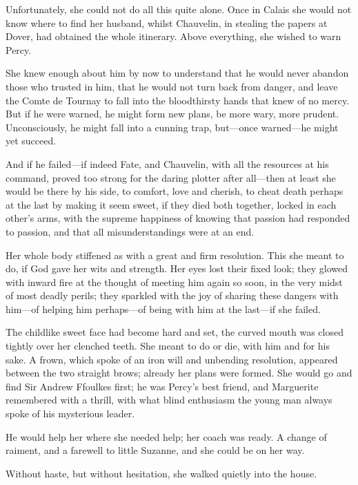 Unfortunately, she could not do all this quite alone. Once in Calais she would not know where to find her husband, whilst Chauvelin, in stealing the papers at Dover, had obtained the whole itinerary. Above everything, she wished to warn Percy.

She knew enough about him by now to understand that he would never abandon those who trusted in him, that he would not turn back from danger, and leave the Comte de Tournay to fall into the bloodthirsty hands that knew of no mercy. But if he were warned, he might form new plans, be more wary, more prudent. Unconsciously, he might fall into a cunning trap, but\allowbreak---\allowbreak once warned\allowbreak---\allowbreak he might yet succeed.

And if he failed\allowbreak---\allowbreak if indeed Fate, and Chauvelin, with all the resources at his command, proved too strong for the daring plotter after all\allowbreak---\allowbreak then at least she would be there by his side, to comfort, love and cherish, to cheat death perhaps at the last by making it seem sweet, if they died both together, locked in each other's arms, with the supreme happiness of knowing that passion had responded to passion, and that all misunderstandings were at an end.

Her whole body stiffened as with a great and firm resolution. This she meant to do, if God gave her wits and strength. Her eyes lost their fixed look; they glowed with inward fire at the thought of meeting him again so soon, in the very midst of most deadly perils; they sparkled with the joy of sharing these dangers with him\allowbreak---\allowbreak of helping him perhaps\allowbreak---\allowbreak of being with him at the last\allowbreak---\allowbreak if she failed.

The childlike sweet face had become hard and set, the curved mouth was closed tightly over her clenched teeth. She meant to do or die, with him and for his sake. A frown, which spoke of an iron will and unbending resolution, appeared between the two straight brows; already her plans were formed. She would go and find Sir Andrew Ffoulkes first; he was Percy's best friend, and Marguerite remembered with a thrill, with what blind enthusiasm the young man always spoke of his mysterious leader.

He would help her where she needed help; her coach was ready. A change of raiment, and a farewell to little Suzanne, and she could be on her way.

Without haste, but without hesitation, she walked quietly into the house.